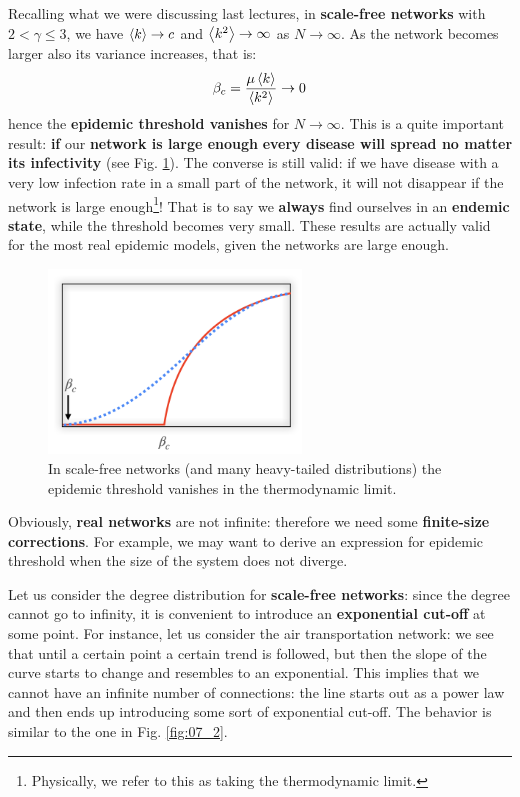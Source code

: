 \documentclass[../main/main.tex]{subfiles}
\begin{document}
Recalling what we were discussing last lectures, in \textbf{scale-free networks} with \( 2 < \gamma \le 3  \), we have \( \expval{k} \rightarrow c  \) and \( \expval{k^2}  \rightarrow \infty  \) as \( N \rightarrow \infty  \).
As the network becomes larger also its variance increases, that is:
\begin{equation*}
  \beta _c = \frac{\mu \expval{k} }{\expval{k^2} } \rightarrow 0
\end{equation*}
hence the \textbf{epidemic threshold vanishes} for \( N \rightarrow \infty  \).
This is a quite important result: \textbf{if} our \textbf{network is large enough} \textbf{every disease will spread no matter its infectivity} (see Fig. \ref{fig:07_1}). The converse is still valid: if we have disease with a very low infection rate in a small part of the network, it will not disappear if the network is large enough\footnote{Physically, we refer to this as taking the thermodynamic limit.}! That is to say we \textbf{always} find ourselves in an \textbf{endemic state}, while the threshold becomes very small. These results are actually valid for the most real epidemic models, given the networks are large enough.

\begin{figure}[h!]
\centering
\includegraphics[width=0.6\textwidth]{../lessons/image/07/1.png}
\caption{\label{fig:07_1} In scale-free networks (and many heavy-tailed distributions) the epidemic threshold vanishes in the thermodynamic limit.}
\end{figure}

Obviously, \textbf{real networks} are not infinite: therefore we need some \textbf{finite-size corrections}. For example, we may want to derive an expression for epidemic threshold when the size of the system does not diverge.

Let us consider the degree distribution for \textbf{scale-free networks}: since the degree cannot go to infinity, it is convenient to introduce an \textbf{exponential cut-off} at some point. For instance, let us consider the air transportation network: we see that until a certain point a certain trend is followed, but then the slope of the curve starts to change and resembles to an exponential. This implies that we cannot have an infinite number of connections: the line starts out as a power law and then ends up introducing some sort of exponential cut-off. The behavior is similar to the one in Fig. \ref{fig:07_2}.
\end{document}

